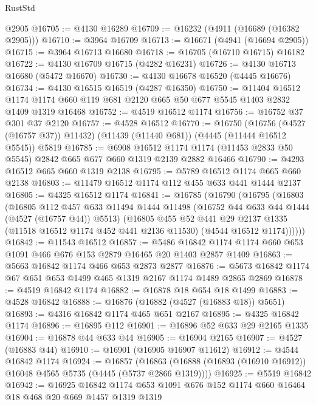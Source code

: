 \begin{lexlean}{RustStd}
\begin{coremodule}
    @2905
@16705 := @4130 @16289
@16709 := @16232 (@4911 (@16689 (@16382 @2905)))
@16710 := @3964 @16709
@16713 := @16671 (@4941 (@16694 @2905))
@16715 := @3964 @16713 @16680
@16718 := @16705 (@16710 @16715) @16182
@16722 := @4130 @16709 @16715 (@4282 @16231)
@16726 := @4130 @16713 @16680 (@5472 @16670)
@16730 := @4130 @16678 @16520 (@4445 @16676)
@16734 := @4130 @16515 @16519 (@4287 @16350)
@16750 := @11404
    @16512
    @1174
    @1174
    @660
    @119
    @681
    @2120
    @665
    @50
    @677
    @5545
    @1403
    @2832
    @1409
    @1319
    @16468
@16752 := @4519 @16512 @1174
@16756 := @16752 @37 @301 @37 @2120
@16757 := @4528 @16512
@16770 := @16750
    (@16756 (@4527 (@16757 @37)) @11432)
    (@11439 (@11440 @681))
    (@4445 (@11444 @16512 @5545))
    @5819
@16785 := @6908
    @16512
    @1174
    @1174
    (@11453 @2833 @50 @5545)
    @2842
    @665
    @677
    @660
    @1319
    @2139
    @2882
    @16466
@16790 := @4293 @16512 @665 @660 @1319 @2138
@16795 := @5789 @16512 @1174 @665 @660 @2138
@16803 := @11479 @16512 @1174 @112 @455 @633 @441 @1444 @2137
@16805 := @4325 @16512 @1174
@16841 := @16785
    (@16790
      (@16795
        (@16803
          (@16805
            @112
            @457
            @633
            @11494
            @1444
            @11498
            (@16752 @44 @633 @44 @1444 (@4527 (@16757 @44)) @5513)
            (@16805
              @455
              @52
              @441
              @29
              @2137
              @1335
              (@11518 @16512 @1174 @452 @441 @2136 @11530)
              (@4544 @16512 @1174))))))
@16842 := @11543 @16512
@16857 := @5486 @16842 @1174 @1174 @660 @653 @1091 @466 @676 @153 @2879 @16465 @20 @1403 @2857 @1409
@16863 := @5663 @16842 @1174 @466 @653 @2873 @2877
@16876 := @5673 @16842 @1174 @67 @651 @653 @1499 @465 @1319 @2167 @1174 @1489 @2865 @2869
@16878 := @4519 @16842 @1174
@16882 := @16878 @18 @654 @18 @1499
@16883 := @4528 @16842
@16888 := @16876 (@16882 (@4527 (@16883 @18)) @5651)
@16893 := @4316 @16842 @1174 @465 @651 @2167
@16895 := @4325 @16842 @1174
@16896 := @16895 @112
@16901 := @16896 @52 @633 @29 @2165 @1335
@16904 := @16878 @44 @633 @44
@16905 := @16904 @2165
@16907 := @4527 (@16883 @44)
@16910 := @16901 (@16905 @16907 @11612)
@16912 := @4544 @16842 @1174
@16924 := @16857
    (@16863 (@16888 (@16893 (@16910 @16912)) @16048 @4565 @5735 (@4445 (@5737 @2866 @1319))))
@16925 := @5519 @16842
@16942 := @16925
    @16842
    @1174
    @653
    @1091
    @676
    @152
    @1174
    @660
    @16464
    @18
    @468
    @20
    @669
    @1457
    @1319
    @1319

\end{coremodule}
\end{lexlean}
